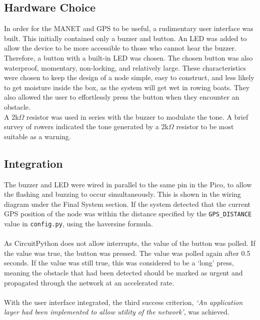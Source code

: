 \documentclass[12pt,a4paper]{report}
\begin{document}
\subsection{Hardware Choice}
In order for the MANET and GPS to be useful, a rudimentary user interface was built. This initially contained only a buzzer and button. An LED was added to allow the device to be more accessible to those who cannot hear the buzzer. \\
Therefore, a button with a built-in LED was chosen.  The chosen button was also waterproof, momentary, non-locking, and relatively large. These characteristics were chosen to keep the design of a node simple, easy to construct, and less likely to get moisture inside the box, as the system will get wet in rowing boats. They also allowed the user to effortlessly press the button when they encounter an obstacle. \\
A 2k$\Omega$ resistor was used in series with the buzzer to modulate the tone. A brief survey of rowers indicated the tone generated by a 2k$\Omega$ resistor to be most suitable as a warning. 

\subsection{Integration}
The buzzer and LED were wired in parallel to the same pin in the Pico, to allow the flashing and buzzing to occur simultaneously. This is shown in the wiring diagram under the Final System section. If the system detected that the current GPS position of the node was within the distance specified by the \verb'GPS_DISTANCE' value in \verb'config.py', using the haversine formula. \\ \\ 
As CircuitPython does not allow interrupts, the value of the button was polled. If the value was true, the button was pressed. The value was polled again after 0.5 seconds. If the value was still true, this was considered to be a `long' press, meaning the obstacle that had been detected should be marked as urgent and propagated through the network at an accelerated rate. \\ \\
With the user interface integrated, the third success criterion, \emph{`An application layer had been implemented to allow utility of the network'}, was achieved. 
\end{document}
